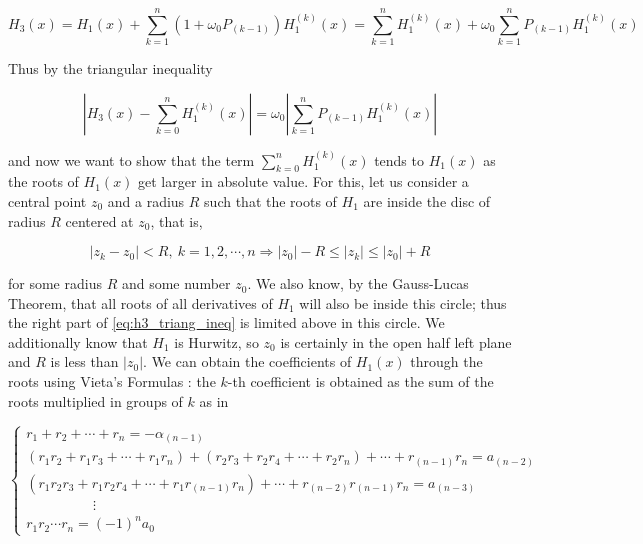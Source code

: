 \begin{equation} H_3(x) = H_1(x) + \sum_{k=1}^n \left(1 + \omega_0 P_{(k-1)}\right) H_1^{(k)}(x) = \sum_{k=1}^n H_1^{(k)}(x) + \omega_0 \sum_{k=1}^n P_{(k-1)}H_1^{(k)}(x) \label{eq:h3_h1_rel}\end{equation}

	Thus by the triangular inequality

\begin{equation} \left\lvert H_3(x) - \sum_{k=0}^n H_1^{(k)}(x)\right\rvert = \omega_0 \left\lvert \sum_{k=1}^n P_{(k-1)}H_1^{(k)}(x)\right\rvert \label{eq:h3_triang_ineq}\end{equation}

	\noindent and now we want to show that the term $\sum_{k=0}^n H_1^{(k)}(x)$ tends to $H_1(x)$ as the roots of $H_1(x)$ get larger in absolute value. For this, let us consider a central point $z_0$ and a radius $R$ such that the roots of $H_1$ are inside the disc of radius $R$ centered at $z_0$, that is,

\begin{equation} \left\lvert z_k - z_0\right\rvert < R,\ k= 1,2,\cdots,n \Rightarrow \left\lvert z_0\right\rvert - R \leq \left\lvert z_k\right\rvert \leq \left\lvert z_0\right\rvert + R \label{eq:roots_radius_ineq}\end{equation}

	\noindent for some radius $R$ and some number $z_0$. We also know, by the Gauss-Lucas Theorem, that all roots of all derivatives of $H_1$ will also be inside this circle; thus the right part of \eqref{eq:h3_triang_ineq} is limited above in this circle. We additionally know that $H_1$ is Hurwitz, so $z_0$ is certainly in the open half left plane and $R$ is less than $\left\lvert z_0\right\rvert$. We can obtain the coefficients of $H_1(x)$ through the roots using Vieta's Formulas : the $k$-th coefficient is obtained as the sum of the roots multiplied in groups of $k$ as in

\begin{equation}
	\left\{\begin{array}{l}
		r_1 + r_2 + \cdots + r_n = -\alpha_{(n-1)} \\[3mm]
		\left(r_1r_2 + r_1r_3 + \cdots + r_1r_n\right) + \left(r_2r_3 + r_2r_4 + \cdots + r_2r_n\right) + \cdots + r_{(n-1)}r_n = a_{(n-2)} \\[3mm]
		\left(r_1r_2r_3 + r_1r_2r_4 + \cdots + r_1r_{(n-1)}r_n\right) + \cdots + r_{(n-2)}r_{(n-1)}r_n = a_{(n-3)} \\[3mm]
		\hspace{2cm} \vdots \\[3mm]
		r_1r_2 \cdots r_n = \left(-1\right)^n a_0
	\end{array}\right. \label{eq:vietas_formulas}
\end{equation}

